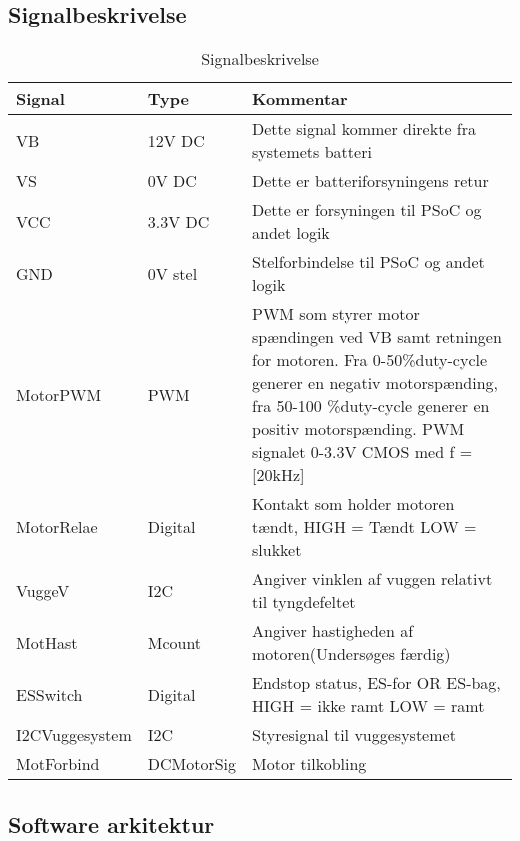 \subsection*{Signalbeskrivelse}
\begin{center}
\begin{longtable}{|p{3cm}|p{2cm}|p{6cm}|}
\caption[Signalbeskrivelse for vuggesystem]{Signalbeskrivelse} 

\label{signalbeskr_vugge_tabel} \\

\hline 

\multicolumn{1}{|p{3cm}|}{\textbf{Signal}} & 
\multicolumn{1}{p{2cm}|}{\textbf{Type}} & 
\multicolumn{1}{p{6cm}|}{\textbf{Kommentar}} \\
\hline 

\endhead




\hline \hline
\endlastfoot

VB & 12V DC & Dette signal kommer direkte fra systemets batteri\\
\hline
VS & 0V DC & Dette er batteriforsyningens retur\\
\hline
VCC & 3.3V DC & Dette er forsyningen til PSoC og andet logik\\
\hline
GND & 0V stel & Stelforbindelse til PSoC og andet logik\\
\hline
MotorPWM & PWM & PWM som styrer motor spændingen ved VB samt retningen for motoren. Fra 0-50\%duty-cycle generer en negativ motorspænding, fra 50-100 \%duty-cycle generer en positiv motorspænding.  PWM signalet 0-3.3V CMOS med f = [20kHz]\\
\hline
MotorRelae & Digital & Kontakt som holder motoren tændt,  HIGH = Tændt LOW = slukket  \\
\hline
VuggeV & I2C & Angiver vinklen af vuggen relativt til tyngdefeltet\\
\hline
MotHast & Mcount & Angiver hastigheden af motoren(Undersøges færdig)\\
\hline
ESSwitch & Digital & Endstop status, ES-for OR ES-bag, HIGH = ikke ramt LOW = ramt\\
\hline
I2CVuggesystem & I2C & Styresignal til vuggesystemet\\
\hline
MotForbind & DCMotorSig & Motor tilkobling\\
\hline

\end{longtable}
\end{center}

\newpage
\subsection{Software arkitektur}
\label{Vuggesystem: Software}

